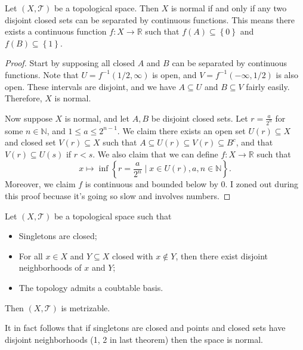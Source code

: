 \begin{lemma}[Urysohn]\label{lma:3.1}
	Let $(X,\mathcal{T} )$ be a topological space. Then $X$ is normal if and only if any two disjoint closed sets can be separated by continuous functions. This means there exists a continuous function $f : X \to \mathbb{R} $ such that $f(A)\subseteq \left\{ 0 \right\} $ and $f(B)\subseteq \left\{ 1 \right\} $.
\end{lemma}
\begin{proof}
	Start by supposing all closed $A$ and $B$ can be separated by continuous functions. Note that $U=f^{-1} (1/2,\infty )$ is open, and $V=f^{-1} (-\infty ,1/2)$ is also open. These intervals are disjoint, and we have $A\subseteq U$ and $B\subseteq V$ fairly easily. Therefore, $X$ is normal.

	Now suppose $X$ is normal, and let $A,B$ be disjoint closed sets. Let $r=\frac{a}{2^n} $ for some $n\in\mathbb{N} $, and $1\leq a\leq 2^{n-1} $. We claim there exists an open set $U(r)\subseteq X$ and closed set $V(r)\subseteq X$ such that $A\subseteq U(r)\subseteq V(r)\subseteq B^{c} $, and that $V(r)\subseteq U\left(s \right) $ if $r<s$. We also claim that we can define $f : X \to \mathbb{R} $ such that
	\[
		x\mapsto \inf \left\{ r=\frac{a}{2^n}  \mid x\in U\left( r \right),a,n\in\mathbb{N}   \right\} 
	.\]
	Moreover, we claim $f$ is continuous and bounded below by $0$. I zoned out during this proof becuase it's going so slow and involves numbers.
\end{proof}

\begin{theorem}\label{thm:3.1}
	Let $(X,\mathcal{T} )$ be a topological space such that
	\begin{itemize}
		\item Singletons are closed;
		\item For all $x\in X$ and $Y\subseteq X$ closed with $x\notin Y$, then there exist disjoint neighborhoods of $x$ and $Y$;
		\item The topology admits a coubtable basis.
	\end{itemize}
	Then $(X,\mathcal{T} )$ is metrizable.
\end{theorem}
\begin{remark}
	It in fact follows that if singletons are closed and points and closed sets have disjoint neighborhoods (1, 2 in last theorem) then the space is normal.
\end{remark}
